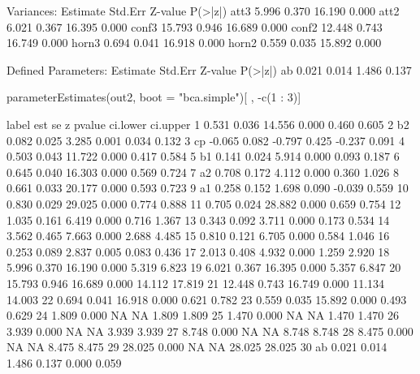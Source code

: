 \begin{Schunk}
\begin{Soutput}
Variances:
                   Estimate  Std.Err  Z-value  P(>|z|)
    att3              5.996    0.370   16.190    0.000
    att2              6.021    0.367   16.395    0.000
    conf3            15.793    0.946   16.689    0.000
    conf2            12.448    0.743   16.749    0.000
    horn3             0.694    0.041   16.918    0.000
    horn2             0.559    0.035   15.892    0.000

Defined Parameters:
                   Estimate  Std.Err  Z-value  P(>|z|)
    ab                0.021    0.014    1.486    0.137
\end{Soutput}
\begin{Sinput}
 parameterEstimates(out2, boot = "bca.simple")[ , -c(1 : 3)]
\end{Sinput}
\begin{Soutput}
   label    est    se      z pvalue ci.lower ci.upper
1         0.531 0.036 14.556  0.000    0.460    0.605
2     b2  0.082 0.025  3.285  0.001    0.034    0.132
3     cp -0.065 0.082 -0.797  0.425   -0.237    0.091
4         0.503 0.043 11.722  0.000    0.417    0.584
5     b1  0.141 0.024  5.914  0.000    0.093    0.187
6         0.645 0.040 16.303  0.000    0.569    0.724
7     a2  0.708 0.172  4.112  0.000    0.360    1.026
8         0.661 0.033 20.177  0.000    0.593    0.723
9     a1  0.258 0.152  1.698  0.090   -0.039    0.559
10        0.830 0.029 29.025  0.000    0.774    0.888
11        0.705 0.024 28.882  0.000    0.659    0.754
12        1.035 0.161  6.419  0.000    0.716    1.367
13        0.343 0.092  3.711  0.000    0.173    0.534
14        3.562 0.465  7.663  0.000    2.688    4.485
15        0.810 0.121  6.705  0.000    0.584    1.046
16        0.253 0.089  2.837  0.005    0.083    0.436
17        2.013 0.408  4.932  0.000    1.259    2.920
18        5.996 0.370 16.190  0.000    5.319    6.823
19        6.021 0.367 16.395  0.000    5.357    6.847
20       15.793 0.946 16.689  0.000   14.112   17.819
21       12.448 0.743 16.749  0.000   11.134   14.003
22        0.694 0.041 16.918  0.000    0.621    0.782
23        0.559 0.035 15.892  0.000    0.493    0.629
24        1.809 0.000     NA     NA    1.809    1.809
25        1.470 0.000     NA     NA    1.470    1.470
26        3.939 0.000     NA     NA    3.939    3.939
27        8.748 0.000     NA     NA    8.748    8.748
28        8.475 0.000     NA     NA    8.475    8.475
29       28.025 0.000     NA     NA   28.025   28.025
30    ab  0.021 0.014  1.486  0.137    0.000    0.059
\end{Soutput}
\end{Schunk}
